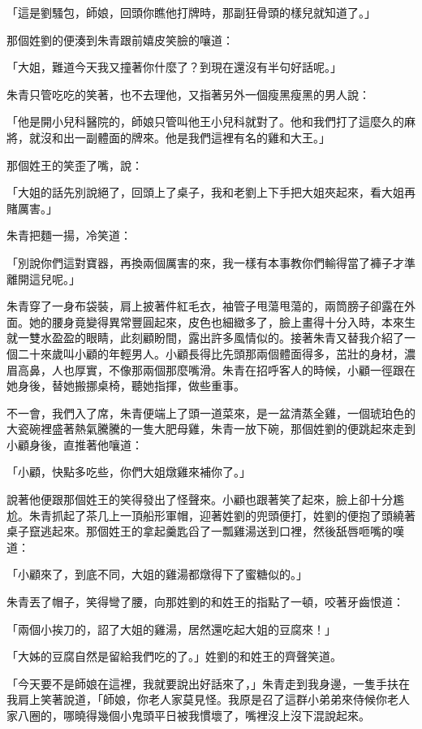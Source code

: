 \documentclass[b5paper,11pt,twoside,twocolumn]{ctexbook}
\begin{document}
「這是劉騷包，師娘，回頭你瞧他打牌時，那副狂骨頭的樣兒就知道了。」

那個姓劉的便湊到朱青跟前嬉皮笑臉的嚷道：

「大姐，難道今天我又撞著你什麼了？到現在還沒有半句好話呢。」

朱青只管吃吃的笑著，也不去理他，又指著另外一個瘦黑瘦黑的男人說：

「他是開小兒科醫院的，師娘只管叫他王小兒科就對了。他和我們打了這麼久的麻將，就沒和出一副體面的牌來。他是我們這裡有名的雞和大王。」

那個姓王的笑歪了嘴，說：

「大姐的話先別說絕了，回頭上了桌子，我和老劉上下手把大姐夾起來，看大姐再賭厲害。」

朱青把麵一揚，冷笑道：

「別說你們這對寶器，再換兩個厲害的來，我一樣有本事教你們輸得當了褲子才準離開這兒呢。」

朱青穿了一身布袋裝，肩上披著件紅毛衣，袖管子甩蕩甩蕩的，兩筒膀子卻露在外面。她的腰身竟變得異常豐圓起來，皮色也細緻多了，臉上畫得十分入時，本來生就一雙水盈盈的眼睛，此刻顧盼間，露出許多風情似的。接著朱青又替我介紹了一個二十來歲叫小顧的年輕男人。小顧長得比先頭那兩個體面得多，茁壯的身材，濃眉高鼻，人也厚實，不像那兩個那麼嘴滑。朱青在招呼客人的時候，小顧一徑跟在她身後，替她搬挪桌椅，聽她指揮，做些重事。

不一會，我們入了席，朱青便端上了頭一道菜來，是一盆清蒸全雞，一個琥珀色的大瓷碗裡盛著熱氣騰騰的一隻大肥母雞，朱青一放下碗，那個姓劉的便跳起來走到小顧身後，直推著他嚷道：

「小顧，快點多吃些，你們大姐燉雞來補你了。」

說著他便跟那個姓王的笑得發出了怪聲來。小顧也跟著笑了起來，臉上卻十分尷尬。朱青抓起了茶几上一頂船形軍帽，迎著姓劉的兜頭便打，姓劉的便抱了頭繞著桌子竄逃起來。那個姓王的拿起羹匙舀了一瓢雞湯送到口裡，然後舐唇咂嘴的嘆道：

「小顧來了，到底不同，大姐的雞湯都燉得下了蜜糖似的。」

朱青丟了帽子，笑得彎了腰，向那姓劉的和姓王的指點了一頓，咬著牙齒恨道：

「兩個小挨刀的，詔了大姐的雞湯，居然還吃起大姐的豆腐來！」

「大姊的豆腐自然是留給我們吃的了。」姓劉的和姓王的齊聲笑道。

「今天要不是師娘在這裡，我就要說出好話來了，」朱青走到我身邊，一隻手扶在我肩上笑著說道，「師娘，你老人家莫見怪。我原是召了這群小弟弟來侍候你老人家八圈的，哪曉得幾個小鬼頭平日被我慣壞了，嘴裡沒上沒下混說起來。
\end{document}
